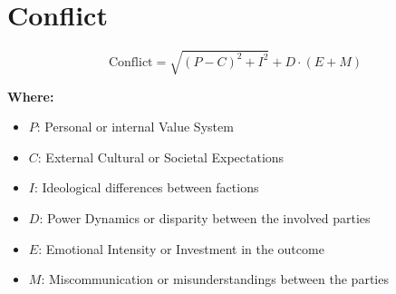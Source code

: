 \chapter{Conflict}

\begin{equation}
\text{Conflict} = \sqrt{(P - C)^2 + I^2} + D \cdot (E + M)
\end{equation}

\textbf{Where:}

\begin{itemize}
    \item $P$: Personal or internal Value System
    \item $C$: External Cultural or Societal Expectations
    \item $I$: Ideological differences between factions
    \item $D$: Power Dynamics or disparity between the involved parties
    \item $E$: Emotional Intensity or Investment in the outcome
    \item $M$: Miscommunication or misunderstandings between the parties
\end{itemize}